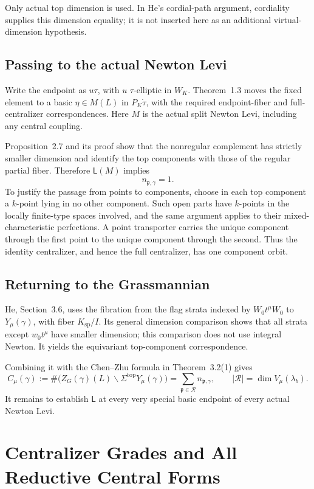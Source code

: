 \documentclass[11pt,a4paper]{article}
\theoremstyle{definition}
\theoremstyle{remark}
\begin{document}
Only actual top dimension is used. In He's cordial-path argument,
cordiality supplies this dimension equality; it is not inserted here
as an additional virtual-dimension hypothesis.

\subsection{Passing to the actual Newton Levi}
Write the endpoint as \(u\tau\), with \(u\) \(\tau\)-elliptic in
\(W_K\). Theorem~1.3 moves the fixed element to a basic
\(\eta\in M(L)\) in \(P_K\dot\tau\), with the required endpoint-fiber
and full-centralizer correspondences. Here \(M\) is the actual
split Newton Levi, including any central coupling.

Proposition~2.7 and its proof show that the nonregular complement has
strictly smaller dimension and identify the top components with
those of the regular partial fiber. Therefore \(\mathsf L(M)\)
implies
\[
n_{\mathfrak p,\gamma}=1.
\]
To justify the passage from points to components, choose in each
top component a \(k\)-point lying in no other component. Such open
parts have \(k\)-points in the locally finite-type spaces involved,
and the same argument applies to their mixed-characteristic
perfections. A point transporter carries the unique component
through the first point to the unique component through the second.
Thus the identity centralizer, and hence the full centralizer, has
one component orbit.

\subsection{Returning to the Grassmannian}
He, Section~3.6, uses the fibration from the flag strata indexed by
\(W_0t^\mu W_0\) to \(Y_\mu(\gamma)\), with fiber
\(K_{\mathrm{sp}}/I\). Its general dimension comparison shows that
all strata except \(w_0t^\mu\) have smaller dimension; this comparison
does not use integral Newton. It yields the equivariant top-component
correspondence.

Combining it with the Chen--Zhu formula in Theorem~3.2(1) gives
\[
C_\mu(\gamma):=
\#\bigl(Z_G(\gamma)(L)\backslash
\Sigma^{\mathrm{top}}Y_\mu(\gamma)\bigr)
=\sum_{\mathfrak p\in\mathcal R}n_{\mathfrak p,\gamma},
\qquad
|\mathcal R|=\dim V_\mu(\lambda_b).
\]
It remains to establish \(\mathsf L\) at every very special basic
endpoint of every actual Newton Levi.

\section{Centralizer Grades and All Reductive Central Forms}
\label{sec:central-transfer}
\end{document}
